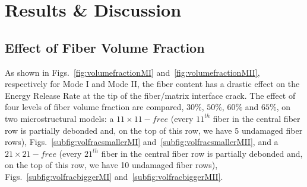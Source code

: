 \documentclass[review]{elsarticle}
\begin{document}

\section{Results \& Discussion}

\subsection{Effect of Fiber Volume Fraction}\label{subsec:volfrac}

As shown in Figs.~\ref{fig:volumefractionMI} and~\ref{fig:volumefractionMII}, respectively for Mode I and Mode II, the fiber content has a drastic effect on the Energy Release Rate at the tip of the fiber/matrix interface crack. The effect of four levels of fiber volume fraction are compared, $30\%$, $50\%$, $60\%$ and $65\%$, on two microstructural models: a $11\times 11-free$ (every $11^{th}$ fiber in the central fiber row is partially debonded and, on the top of this row, we have 5 undamaged fiber rows), Figs.~\ref{subfig:volfracsmallerMI} and~\ref{subfig:volfracsmallerMII}, and a $21\times 21-free$ (every $21^{th}$ fiber in the central fiber row is partially debonded and, on the top of this row, we have 10 undamaged fiber rows), Figs.~\ref{subfig:volfracbiggerMI} and~\ref{subfig:volfracbiggerMII}.
\end{document}
